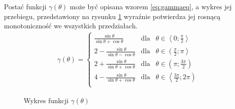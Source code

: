      Postać funkcji $\gamma\left(\theta\right)$ może być opisana wzorem \ref{eq:gammaeq}, a wykres jej przebiegu, przedstawiony na rysunku \ref{fig:gamma} wyraźnie potwierdza jej rosnącą monotoniczność we wszystkich przedziałach.
        \begin{align}\label{eq:gammaeq}
        	\gamma\left(
        		\theta
        	\right) = 
        		\left\{
        			\begin{array}{lcl}
        				\frac{
        					\sin\theta
        				}{
							\sin\theta + \cos\theta        			
        				} & 
        					\text{dla} &
        					\theta \in \left\langle
        						0;
        						\frac{
        							\pi
        						}{
									2        						
        						}
        					\right\rangle\\
        				2
        				- \frac{
        					\sin\theta
        				}{
							\sin\theta - \cos\theta        			
        				} & 
        					\text{dla} &
        					\theta \in \left(
        						\frac{
        							\pi
        						}{
									2        						
        						};
        						\pi
        					\right\rangle\\
        				2
        				+ \frac{
        					\sin\theta
        				}{
							\sin\theta + \cos\theta        			
        				} & 
        					\text{dla} &
        					\theta \in \left(
        						\pi;
        						\frac{
        							3\pi
        						}{
									2        						
        						}
        					\right)\\
        				4
        				- \frac{
        					\sin\theta
        				}{
							\sin\theta + \cos\theta        			
        				} & 
        					\text{dla} &
        					\theta \in \left\langle
        						\frac{
        							3\pi
        						}{
									2        						
        						};
        						2\pi
        					\right)\\
        			\end{array}
        		\right.      		
        \end{align}
        \begin{figure}[h!]
        	\begin{center}
    			
    			\caption{Wykres funkcji $\gamma\left(\theta\right)$}\label{fig:gamma}
    	\end{center}
    	\mysource
    	\end{figure}\vspace{-8 mm}
       
